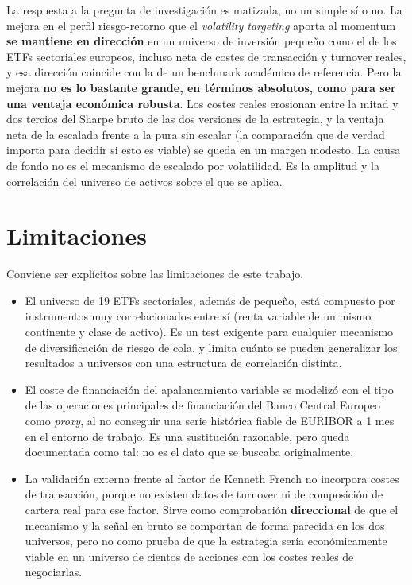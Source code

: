 \documentclass[12pt]{report} %
\begin{document}
La respuesta a la pregunta de investigación es matizada, no un simple sí o no. La mejora en el perfil riesgo-retorno que el \textit{volatility targeting} aporta al momentum \textbf{se mantiene en dirección} en un universo de inversión pequeño como el de los ETFs sectoriales europeos, incluso neta de costes de transacción y turnover reales, y esa dirección coincide con la de un benchmark académico de referencia. Pero la mejora \textbf{no es lo bastante grande, en términos absolutos, como para ser una ventaja económica robusta}. Los costes reales erosionan entre la mitad y dos tercios del Sharpe bruto de las dos versiones de la estrategia, y la ventaja neta de la escalada frente a la pura sin escalar (la comparación que de verdad importa para decidir si esto es viable) se queda en un margen modesto. La causa de fondo no es el mecanismo de escalado por volatilidad. Es la amplitud y la correlación del universo de activos sobre el que se aplica.

\section{Limitaciones}

Conviene ser explícitos sobre las limitaciones de este trabajo.

\begin{itemize}
	\item El universo de 19 ETFs sectoriales, además de pequeño, está compuesto por instrumentos muy correlacionados entre sí (renta variable de un mismo continente y clase de activo). Es un test exigente para cualquier mecanismo de diversificación de riesgo de cola, y limita cuánto se pueden generalizar los resultados a universos con una estructura de correlación distinta.
	\item El coste de financiación del apalancamiento variable se modelizó con el tipo de las operaciones principales de financiación del Banco Central Europeo como \textit{proxy}, al no conseguir una serie histórica fiable de EURIBOR a 1 mes en el entorno de trabajo. Es una sustitución razonable, pero queda documentada como tal: no es el dato que se buscaba originalmente.
	\item La validación externa frente al factor de Kenneth French no incorpora costes de transacción, porque no existen datos de turnover ni de composición de cartera real para ese factor. Sirve como comprobación \textbf{direccional} de que el mecanismo y la señal en bruto se comportan de forma parecida en los dos universos, pero no como prueba de que la estrategia sería económicamente viable en un universo de cientos de acciones con los costes reales de negociarlas.
\end{itemize}
\end{document}
